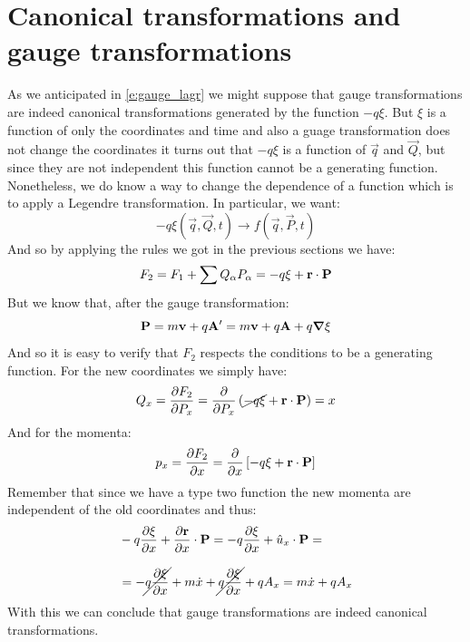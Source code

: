 \section{Canonical transformations and gauge transformations}
As we anticipated in \eqref{e:gauge_lagr} we might suppose that gauge transformations are indeed canonical transformations generated by the function $-q\xi$. But $\xi$ is a function of only the coordinates and time and also a guage transformation does not change the coordinates it turns out that $-q\xi$ is a function of $\vec{q}$ and $\vec{Q}$, but since they are not independent this function cannot be a generating function. Nonetheless, we do know a way to change the dependence of a function which is to apply a Legendre transformation. In particular, we want:
\begin{equation}
  -q\xi (\vec{q},\vec{Q},t) \longrightarrow f (\vec{q},\vec{P},t)
\end{equation}
And so by applying the rules we got in the previous sections we have:
\begin{equation}
  F_2 = F_1 + \displaystyle\sum Q_{\alpha}P_{\alpha} = -q\xi + \vb{r}\cdot \vb{P}
\end{equation}
But we know that, after the gauge transformation:
\begin{equation}
  \vb{P} = m\vb{v} + q\vb{A}' = m\vb{v} + q\vb{A} + q\grad{\xi}
\end{equation}
And so it is easy to verify that $F_2$ respects the conditions to be a generating function. For the new coordinates we simply have:
\begin{equation}
  Q_{x} = \pdv{F_2}{P_x} = \pdv{}{P_x}\brackets{\cancel{-q\xi} + \vec{r}\cdot \vec{P}} = x
\end{equation}
And for the momenta:
\begin{equation}
  p_x = \pdv{F_2}{x} = \pdv{}{x}\sqbr{-q\xi + \vec{r}\cdot \vec{P}}
\end{equation}
Remember that since we have a type two function the new momenta are independent of the old coordinates and thus:
\begin{equation}
  \begin{split}
    &-q\pdv{\xi}{x} + \pdv{\vec{r}}{x} \cdot \vec{P} = -q\pdv{\xi}{x} + \hat{u}_x \cdot \vec{P} = \\[8pt]
    &= -\cancel{q\pdv{\xi}{x}} + m\dot{x} + \cancel{q\pdv{\xi}{x}} + qA_x = m\dot{x} + qA_x
  \end{split}
\end{equation}
With this we can conclude that gauge transformations are indeed canonical transformations.

